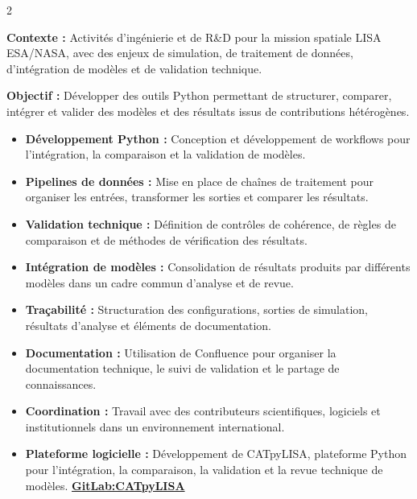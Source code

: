 \documentclass[8pt,a4paper,ragged2e,withhyper]{altacv}
\begin{document}
\begin{paracol}{2}
\divider


\textbf{Contexte :} Activités d'ingénierie et de R\&D pour la mission spatiale LISA ESA/NASA, avec des enjeux de simulation, de traitement de données, d'intégration de modèles et de validation technique.

\textbf{Objectif :} Développer des outils Python permettant de structurer, comparer, intégrer et valider des modèles et des résultats issus de contributions hétérogènes.

\begin{itemize}
  \item \textbf{Développement Python :} Conception et développement de workflows pour l'intégration, la comparaison et la validation de modèles.
  \item \textbf{Pipelines de données :} Mise en place de chaînes de traitement pour organiser les entrées, transformer les sorties et comparer les résultats.
  \item \textbf{Validation technique :} Définition de contrôles de cohérence, de règles de comparaison et de méthodes de vérification des résultats.
  \item \textbf{Intégration de modèles :} Consolidation de résultats produits par différents modèles dans un cadre commun d'analyse et de revue.
  \item \textbf{Traçabilité :} Structuration des configurations, sorties de simulation, résultats d'analyse et éléments de documentation.
  \item \textbf{Documentation :} Utilisation de Confluence pour organiser la documentation technique, le suivi de validation et le partage de connaissances.
  \item \textbf{Coordination :} Travail avec des contributeurs scientifiques, logiciels et institutionnels dans un environnement international.
  \item \textbf{Plateforme logicielle :} Développement de CATpyLISA, plateforme Python pour l'intégration, la comparaison, la validation et la revue technique de modèles. \textcolor{DarkPastelRed}{\href{https://gitlab.oca.eu/gboileau/lisa_l3_tools}{\bf GitLab:CATpyLISA}}
\end{itemize}

\divider



\end{paracol}
\end{document}
